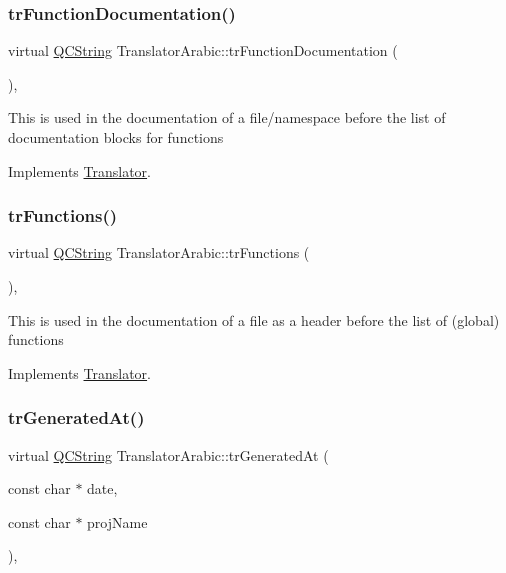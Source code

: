 \subsubsection{\texorpdfstring{trFunctionDocumentation()}{trFunctionDocumentation()}}
{\footnotesize\ttfamily virtual \mbox{\hyperlink{class_q_c_string}{Q\+C\+String}} Translator\+Arabic\+::tr\+Function\+Documentation (\begin{DoxyParamCaption}{ }\end{DoxyParamCaption})\hspace{0.3cm}{\ttfamily [inline]}, {\ttfamily [virtual]}}

This is used in the documentation of a file/namespace before the list of documentation blocks for functions 

Implements \mbox{\hyperlink{class_translator}{Translator}}.

\mbox{\label{class_translator_arabic_abb708c38af7bc9684a7a43ef5656c141}} 
\subsubsection{\texorpdfstring{trFunctions()}{trFunctions()}}
{\footnotesize\ttfamily virtual \mbox{\hyperlink{class_q_c_string}{Q\+C\+String}} Translator\+Arabic\+::tr\+Functions (\begin{DoxyParamCaption}{ }\end{DoxyParamCaption})\hspace{0.3cm}{\ttfamily [inline]}, {\ttfamily [virtual]}}

This is used in the documentation of a file as a header before the list of (global) functions 

Implements \mbox{\hyperlink{class_translator}{Translator}}.

\mbox{\label{class_translator_arabic_a044107447821682b67108e2ecfebe8bb}} 
\subsubsection{\texorpdfstring{trGeneratedAt()}{trGeneratedAt()}}
{\footnotesize\ttfamily virtual \mbox{\hyperlink{class_q_c_string}{Q\+C\+String}} Translator\+Arabic\+::tr\+Generated\+At (\begin{DoxyParamCaption}\item[{const char $\ast$}]{date,  }\item[{const char $\ast$}]{proj\+Name }\end{DoxyParamCaption})\hspace{0.3cm}{\ttfamily [inline]}, {\ttfamily [virtual]}}

